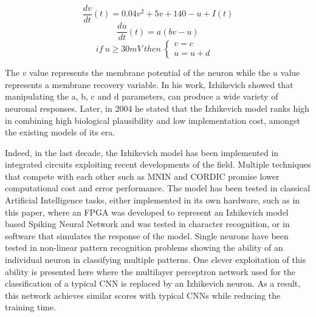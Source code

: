 \documentclass[12pt]{report}
\begin{document}
\begin{equation}
    \frac{dv}{dt}(t) = 0.04v^2+5v+140-u+I(t)
\end{equation}
\begin{equation}
\frac{du}{dt}(t) = a(bv-u)
\end{equation}
\begin{equation}
if \:u\geq30mV \: then \: \left\{
\begin{array}{ll}
     v = c &  \\
     u = u+d & 
\end{array}
\right.
\end{equation}

The \(v\) value represents the membrane potential of the neuron while the \(u\) value represents a membrane recovery variable. In his work, Izhikevich showed that manipulating the a, b, c and d parameters, can produce a wide variety of neuronal responses. Later, in 2004 he stated\cite{Izhikevich2004} that the Izhikevich model ranks high in combining high biological plausibility and low implementation cost, amongst the existing models of its era. 

Indeed, in the last decade, the Izhikevich model has been implemented in integrated circuits exploiting recent developments of the field. Multiple techniques that compete with each other such as MNIN\cite{Haghiri2018} and CORDIC\cite{Elnabawy2018} promise lower computational cost and error performance. The model has been tested in classical Artificial Intelligence tasks, either implemented in its own hardware, such as in this paper\cite{Rice2009}, where an FPGA was developed to represent an Izhikevich model based Spiking Neural Network and was tested in character recognition, or in software that simulates the response of the model. Single neurons have been tested in non-linear pattern recognition problems\cite{Antonio2010} showing the ability of an individual neuron in classifying multiple patterns. One clever exploitation of this ability is presented here\cite{luna-a2019} where the multilayer perceptron network used for the classification of a typical CNN is replaced by an Izhikevich neuron. As a result, this network achieves similar scores with typical CNNs while reducing the training time.
\end{document}
